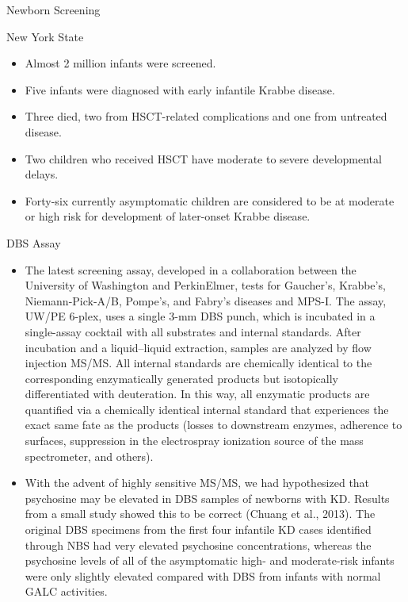 \documentclass[presentation, smaller]{beamer}
\begin{document}
\begin{frame}[label={sec:org256326c}]{Newborn Screening}
\begin{block}{New York State}
\begin{itemize}
\item Almost 2 million infants were screened.
\item Five infants were diagnosed with early infantile Krabbe disease.
\item Three died, two from HSCT-related complications and one from untreated disease.
\item Two children who received HSCT have moderate to severe developmental delays.
\item Forty-six currently asymptomatic children are considered to be at
moderate or high risk for development of later-onset Krabbe disease.
\end{itemize}
\end{block}
\end{frame}


\begin{frame}[label={sec:orgb0d74c8}]{DBS Assay}
\begin{itemize}
\item The latest screening assay, developed in a collaboration between the University of Washington and PerkinElmer, tests for Gaucher’s, Krabbe’s, Niemann-Pick-A/B, Pompe’s, and Fabry’s diseases and MPS-I. The assay, UW/PE 6-plex, uses a single 3-mm DBS punch, which is incubated in a single-assay cocktail with all substrates and internal standards. After incubation and a liquid–liquid extraction, samples are analyzed by flow injection MS/MS. All internal standards are chemically identical to the corresponding enzymatically generated products but isotopically differentiated with deuteration. In this way, all enzymatic products are quantified via a chemically identical internal standard that experiences the exact same fate as the products (losses to downstream enzymes, adherence to surfaces, suppression in the electrospray ionization source of the mass spectrometer, and others).
\item With the advent of highly sensitive MS/MS, we had hypothesized that psychosine may be elevated in DBS samples of newborns with KD. Results from a small study showed this to be correct (Chuang et al., 2013). The original DBS specimens from the first four infantile KD cases identified through NBS had very elevated psychosine concentrations, whereas the psychosine levels of all of the asymptomatic high- and moderate-risk infants were only slightly elevated compared with DBS from infants with normal GALC activities.
\end{itemize}
\end{frame}
\end{document}
